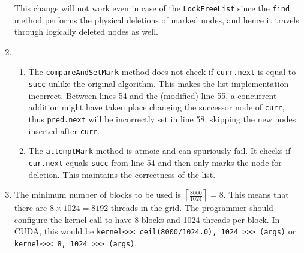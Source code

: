 \documentclass[conference,compsoc,twocolumn]{IEEEtran}
\begin{document}
\begin{enumerate}
    This change will not work even in case of the \texttt{LockFreeList} since
    the \texttt{find} method performs the physical deletions of marked nodes,
    and hence it travels through logically deleted nodes as well.

    \item
    \begin{enumerate}
        \item The \texttt{compareAndSetMark} method does not check if
        \texttt{curr.next} is equal to \texttt{succ} unlike the original
        algorithm. This makes the list implementation incorrect. Between lines
        54 and the (modified) line 55, a concurrent addition might have taken
        place changing the successor node of \texttt{curr}, thus
        \texttt{pred.next} will be incorrectly set in line 58, skipping the new
        nodes inserted after \texttt{curr}.

        \item The \texttt{attemptMark} method is atmoic and can spuriously fail.
        It checks if \texttt{cur.next} equals \texttt{succ} from line 54 and
        then only marks the node for deletion. This maintains the correctness of
        the list.
    \end{enumerate}

    \item The minimum number of blocks to be used is
    \(\left\lceil\frac{8000}{1024}\right\rceil = 8\). This means that there are
    \(8 \times 1024 = 8192\) threads in the grid. The programmer should
    configure the kernel call to have 8 blocks and 1024 threads per block. In
    CUDA, this would be \texttt{kernel<<< ceil(8000/1024.0), 1024 >>> (args)} or
    \texttt{kernel<<< 8, 1024 >>> (args)}.
\end{enumerate}
\end{document}
